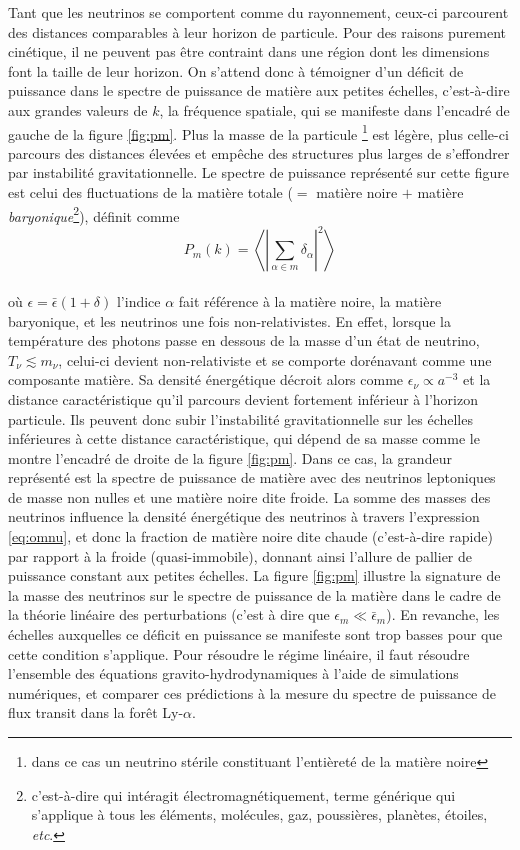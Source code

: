 Tant que les neutrinos se comportent comme du rayonnement, ceux-ci parcourent des distances comparables à leur horizon de particule. Pour des raisons purement cinétique, il ne peuvent pas être contraint dans une région dont les dimensions font la taille de leur horizon. On s'attend donc à témoigner d'un déficit de puissance dans le spectre de puissance de matière aux petites échelles, c'est-à-dire aux grandes valeurs de $k$, la fréquence spatiale, qui se manifeste dans l'encadré de gauche de la figure \ref{fig:pm}. Plus la masse de la particule \footnote{dans ce cas un neutrino stérile constituant l'entièreté de la matière noire} est légère, plus celle-ci parcours des distances élevées et empêche des structures plus larges de s'effondrer par instabilité gravitationnelle. Le spectre de puissance représenté sur cette figure est celui des fluctuations de la matière totale ($=$ matière noire $+$ matière \textit{baryonique}\footnote{c'est-à-dire qui intéragit électromagnétiquement, terme générique qui s'applique à tous les éléments, molécules, gaz, poussières, planètes, étoiles, \textit{etc}.}), définit comme \\
\begin{equation}
P_m(k) = \left\langle \left\vert \sum\limits_{\alpha \in m} \delta_\alpha \right\vert^2 \right\rangle
\end{equation} \\ où $\epsilon = \bar{\epsilon} \left( 1 + \delta \right)$ l'indice $\alpha$ fait référence à la matière noire, la matière baryonique, et les neutrinos une fois non-relativistes. En effet, lorsque la température des photons passe en dessous de la masse d'un état de neutrino, $T_\nu \lesssim m_\nu$, celui-ci devient non-relativiste et se comporte dorénavant comme une composante matière. Sa densité énergétique décroit alors comme $\epsilon_\nu \propto a^{-3}$ et la distance caractéristique qu'il parcours devient fortement inférieur à l'horizon particule. Ils peuvent donc subir l'instabilité gravitationnelle sur les échelles inférieures à cette distance caractéristique, qui dépend de sa masse comme le montre l'encadré de droite de la figure \ref{fig:pm}. Dans ce cas, la grandeur représenté est la spectre de puissance de matière avec des neutrinos leptoniques de masse non nulles et une matière noire dite froide. La somme des masses des neutrinos influence la densité énergétique des neutrinos à travers l'expression \ref{eq:omnu}, et donc la fraction de matière noire dite chaude (c'est-à-dire rapide) par rapport à la froide (quasi-immobile), donnant ainsi l'allure de pallier de puissance constant aux petites échelles. La figure \ref{fig:pm} illustre la signature de la masse des neutrinos sur le spectre de puissance de la matière dans le cadre de la théorie linéaire des perturbations (c'est à dire que $\epsilon_m \ll \bar{\epsilon}_m$). En revanche, les échelles auxquelles ce déficit en puissance se manifeste sont trop basses pour que cette condition s'applique. Pour résoudre le régime linéaire, il faut résoudre l'ensemble des équations gravito-hydrodynamiques à l'aide de simulations numériques, et comparer ces prédictions à la mesure du spectre de puissance de flux transit dans la forêt Ly-$\alpha$.


